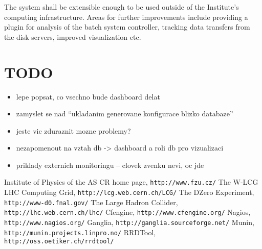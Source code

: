 \documentclass[12pt]{article}
\begin{document}
The system shall be extensible enough to be used outside of the Institute's computing infrastructure.  Areas for further
improvements include providing a plugin for analysis of the batch system controller, tracking data transfers from the disk
servers, improved visualization etc.

\section{TODO}

\begin{itemize}
    \item{lepe popsat, co vsechno bude dashboard delat}
    \item{zamyslet se nad ``ukladanim generovane konfigurace blizko databaze''}
    \item{jeste vic zduraznit mozne problemy?}
    \item{nezapomenout na vztah db -> dashboard a roli db pro vizualizaci}
    \item{priklady externich monitoringu -- clovek zvenku nevi, oc jde}
\end{itemize}

\begin{thebibliography}{9}
    Institute of Physics of the AS CR home page, {\tt http://www.fzu.cz/}
    The W-LCG LHC Computing Grid, {\tt http://lcg.web.cern.ch/LCG/}
    The DZero Experiment, {\tt http://www-d0.fnal.gov/}
    The Large Hadron Collider, {\tt http://lhc.web.cern.ch/lhc/}
    Cfengine, {\tt http://www.cfengine.org/}
    Nagios, {\tt http://www.nagios.org/}
    Ganglia, {\tt http://ganglia.sourceforge.net/}
    Munin, {\tt http://munin.projects.linpro.no/}
    RRDTool, {\tt http://oss.oetiker.ch/rrdtool/}
\end{thebibliography}
\end{document}
